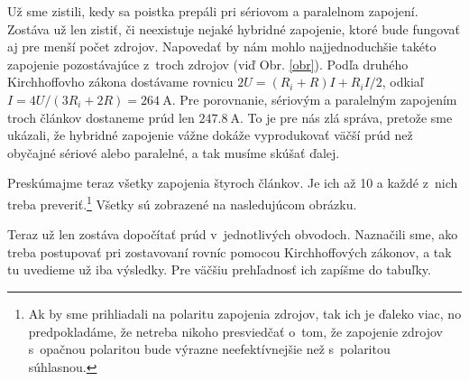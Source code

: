 Už sme zistili, kedy sa poistka prepáli pri sériovom a paralelnom
zapojení. Zostáva už len zistiť, či neexistuje nejaké hybridné zapojenie,
ktoré bude fungovať aj pre menší počet zdrojov. Napovedať by nám mohlo
najjednoduchšie takéto zapojenie pozostávajúce z~troch zdrojov (viď
Obr. \ref{obr}). Podľa druhého Kirchhoffovho zákona dostávame rovnicu $2U=\left(R_{i}+R\right)I+R_{i}I/2$,
odkiaľ $I=4U/(3R_{i}+2R)=\SI{264}{\ampere}$. Pre porovnanie, sériovým
a paralelným zapojením troch článkov dostaneme prúd len $\SI{247,8}{\ampere}$.
To je pre nás zlá správa, pretože sme ukázali, že hybridné zapojenie
vážne dokáže vyprodukovať väčší prúd než obyčajné sériové alebo paralelné,
a tak musíme skúšať ďalej.

Preskúmajme teraz všetky zapojenia štyroch článkov. Je ich až 10 a
každé z~nich treba preveriť.\footnote{Ak by sme prihliadali na polaritu zapojenia zdrojov, tak ich je ďaleko
viac, no predpokladáme, že netreba nikoho presviedčať o~tom, že zapojenie
zdrojov s~opačnou polaritou bude výrazne neefektívnejšie než s~polaritou
súhlasnou.} Všetky sú zobrazené na nasledujúcom obrázku.



Teraz už len zostáva dopočítať prúd v~jednotlivých obvodoch. Naznačili
sme, ako treba postupovať pri zostavovaní rovníc pomocou Kirchhoffových
zákonov, a tak tu uvedieme už iba výsledky. Pre väčšiu prehľadnosť
ich zapíšme do tabuľky.

